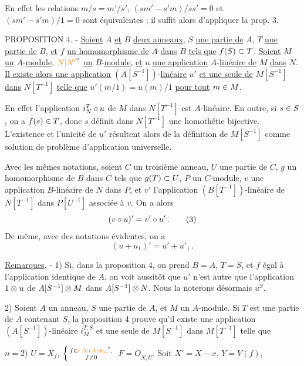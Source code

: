 En effet les relations $m/s=m'/s'$, $(sm'-s'm)/ss'=0$ et $(sm'-s'm)/1=0$ sont équivalentes ; il suffit alors d'appliquer la prop. 3.

PROPOSITION 4. - \uline{Soient} $A$ \uline{et} $B$ \uline{deux anneaux}, $S$ \uline{une partie de} $A$, $T$ \uline{une partie de} $B$, \uline{et} $f$ \uline{un homomorphisme de} $A$ \uline{dans} $B$ \uline{tels que} $f(S)\subset T$. \uline{Soient} $M$ \uline{un} $A$-\uline{module}, $\unsure{N|N'}$ \uline{un} $B$-\uline{module}, \uline{et} $u$ \uline{une application} $A$-\uline{linéaire de} $M$ \uline{dans} $N$. \uline{Il existe alors une application} $(A[S^{-1}])$-\uline{linéaire} $u'$ \uline{et une seule de} $M[S^{-1}]$ \uline{dans} $N[T^{-1}]$ \uline{telle que} $u'(m/1)=u(m)/1$ \uline{pour tout} $m\in M$.

En effet l'application $i_N^T\circ u$ de $M$ dans $N[T^{-1}]$ est $A$-linéaire. En outre, si $s\in S$, on a $f(s)\in T$, donc $s$ définit dans $N[T^{-1}]$ une homothétie bijective. L'existence et l'unicité de $u'$ résultent alors de la définition de $M[S^{-1}]$ comme solution de problème d'application universelle.

Avec les mêmes notations, soient $C$ un troisième anneau, $U$ une partie de $C$, $g$ un homomorphisme de $B$ dans $C$ tels que $g(T)\subset U$, $P$ un $C$-module, $v$ une application $B$-linéaire de $N$ dans $P$, et $v'$ l'application $(B[T^{-1}])$-linéaire de $N[T^{-1}]$ dans $P[U^{-1}]$ associée à $v$. On a alors
\[
(v\circ u)'=v'\circ u'\,.\tag*{(3)}
\]
De même, avec des notations évidentes, on a
\[
(u+u_1)'=u'+u'_1\,.\tag*{(4)}
\]

\uline{Remarques}. - 1) Si, dans la proposition 4, on prend $B=A$, $T=S$, et $f$ égal à l'application identique de $A$, on voit aussitôt que $u'$ n'est autre que l'application $1\otimes u$ de $A[S^{-1}]\otimes M$ dans $A[S^{-1}]\otimes N$. Nous la noterons désormais $u^S$.

2) Soient $A$ un anneau, $S$ une partie de $A$, et $M$ un $A$-module. Si $T$ est une partie de $A$ contenant $S$, la proposition 4 prouve qu'il existe une application $(A[S^{-1}])$-linéaire $i_M^{T,S}$ et une seule de $M[S^{-1}]$ dans $M[T^{-1}]$ telle que

$n=2)$ \qquad $U=X_f$, $\left\{\begin{smallmatrix}f\in\unsure{\operatorname{r}A|\mathfrak r A|\mathfrak m_A},\\ f\ne0\end{smallmatrix}\right.$ \qquad $F=\underline O_{X,U}$. Soit $X'=X-x$, $Y=V(f)$,  

